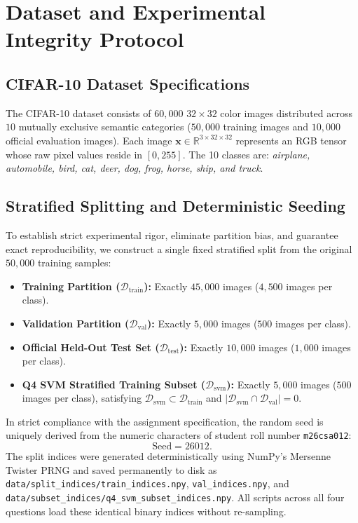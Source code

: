 \section{Dataset and Experimental Integrity Protocol}
\label{sec:dataset}

\subsection{CIFAR-10 Dataset Specifications}
The CIFAR-10 dataset consists of $60{,}000$ $32 \times 32$ color images distributed across $10$ mutually exclusive semantic categories ($50{,}000$ training images and $10{,}000$ official evaluation images). Each image $\mathbf{x} \in \mathbb{R}^{3 \times 32 \times 32}$ represents an RGB tensor whose raw pixel values reside in $[0, 255]$. The 10 classes are: \textit{airplane, automobile, bird, cat, deer, dog, frog, horse, ship, and truck}.

\subsection{Stratified Splitting and Deterministic Seeding}
To establish strict experimental rigor, eliminate partition bias, and guarantee exact reproducibility, we construct a single fixed stratified split from the original $50{,}000$ training samples:
\begin{itemize}
    \item \textbf{Training Partition ($\mathcal{D}_{\text{train}}$):} Exactly $45{,}000$ images ($4{,}500$ images per class).
    \item \textbf{Validation Partition ($\mathcal{D}_{\text{val}}$):} Exactly $5{,}000$ images ($500$ images per class).
    \item \textbf{Official Held-Out Test Set ($\mathcal{D}_{\text{test}}$):} Exactly $10{,}000$ images ($1{,}000$ images per class).
    \item \textbf{Q4 SVM Stratified Training Subset ($\mathcal{D}_{\text{svm}}$):} Exactly $5{,}000$ images ($500$ images per class), satisfying $\mathcal{D}_{\text{svm}} \subset \mathcal{D}_{\text{train}}$ and $|\mathcal{D}_{\text{svm}} \cap \mathcal{D}_{\text{val}}| = 0$.
\end{itemize}

In strict compliance with the assignment specification, the random seed is uniquely derived from the numeric characters of student roll number \texttt{m26csa012}:
\begin{equation}
    \text{Seed} = 26012.
\end{equation}
The split indices were generated deterministically using NumPy's Mersenne Twister PRNG and saved permanently to disk as \texttt{data/split\_indices/train\_indices.npy}, \texttt{val\_indices.npy}, and \texttt{data/subset\_indices/q4\_svm\_subset\_indices.npy}. All scripts across all four questions load these identical binary indices without re-sampling.


